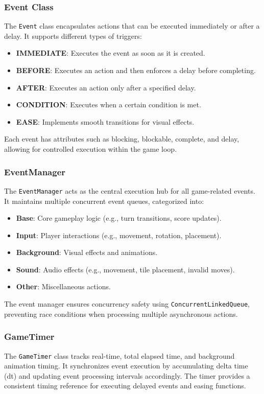 \documentclass[conference]{IEEEtran}
\begin{document}
\subsubsection{Event Class}
The \texttt{Event} class encapsulates actions that can be executed immediately or after a delay. It supports different types of triggers:
\begin{itemize}
    \item \textbf{IMMEDIATE}: Executes the event as soon as it is created.
    \item \textbf{BEFORE}: Executes an action and then enforces a delay before completing.
    \item \textbf{AFTER}: Executes an action only after a specified delay.
    \item \textbf{CONDITION}: Executes when a certain condition is met.
    \item \textbf{EASE}: Implements smooth transitions for visual effects.
\end{itemize}
Each event has attributes such as blocking, blockable, complete, and delay, allowing for controlled execution within the game loop.

\subsubsection{EventManager}
The \texttt{EventManager} acts as the central execution hub for all game-related events. It maintains multiple concurrent event queues, categorized into:
\begin{itemize}
    \item \textbf{Base}: Core gameplay logic (e.g., turn transitions, score updates).
    \item \textbf{Input}: Player interactions (e.g., movement, rotation, placement).
    \item \textbf{Background}: Visual effects and animations.
    \item \textbf{Sound}: Audio effects (e.g., movement, tile placement, invalid moves).
    \item \textbf{Other}: Miscellaneous actions.
\end{itemize}
The event manager ensures concurrency safety using \texttt{ConcurrentLinkedQueue}, preventing race conditions when processing multiple asynchronous actions.

\subsubsection{GameTimer}
The \texttt{GameTimer} class tracks real-time, total elapsed time, and background animation timing. It synchronizes event execution by accumulating delta time (dt) and updating event processing intervals accordingly. The timer provides a consistent timing reference for executing delayed events and easing functions.
\end{document}
